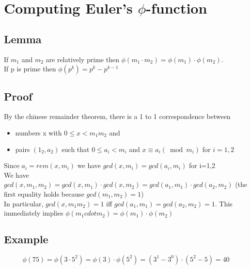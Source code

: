 \documentclass{article}[18pt]
\begin{document}
\section{Computing Euler's $\phi$-function}
\subsection{Lemma}
If $m_1$ and $m_2$ are relatively prime then $\phi(m_1\cdot m_2)=\phi(m_1)\cdot\phi(m_2)$.\\
If p is prime then $\phi(p^k)=p^k-p^{k-1}$
\subsection{Proof}
By the chinese remainder theorem, there is a 1 to 1 correspondence between
\begin{itemize}
	\item numbers x with $0\leqslant x < m_1m_2$ and
	\item pairs $(1_2,a_2)$ such that $0\leqslant a_i <m_i$ and $x\equiv a_i (\bmod m_i)$ for $i=1,2$
\end{itemize}
Since $a_i=rem(x,m_i)$ we have $gcd(x,m_i)=gcd(a_i,m_i)$ for i=1,2\\
We have $gcd(x,m_1,m_2)=gcd(x,m_1)\cdot gcd (x,m_2)=gcd(a_1,m_1)\cdot gcd(a_2,m_2) $ (the first equality holds because $gcd(m_1,m_2)=1$)\\
In particular, $gcd(x,m_1m_2)=1$ iff $gcd(a_1,m_1)=gcd(a_2,m_2)=1$. This immediately implies $\phi(m_1cdot m_2)=\phi(m_1)\cdot\phi(m_2)$
\subsection{Example}
$$\phi ( 75 ) = \phi \left( 3 \cdot 5 ^ { 2 } \right) = \phi ( 3 ) \cdot \phi \left( 5 ^ { 2 } \right) = \left( 3 ^ { 1 } - 3 ^ { 0 } \right) \cdot \left( 5 ^ { 2 } - 5 \right) = 40$$
\end{document}
